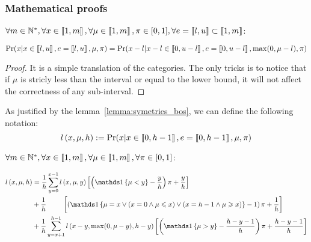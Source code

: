 \subsubsection{Mathematical proofs}

\begin{lemma}
    \label{lemma:symetries_bos}
    $\forall m \in \mathbb{N}^*, \forall x \in \left\llbracket1, m\right\rrbracket, \forall \mu \in \left\llbracket1, m\right\rrbracket, \pi \in [0, 1], \forall e = \left\llbracket l, u\right\rrbracket \subset \left\llbracket1, m\right\rrbracket$:
    
    \[ \Pr(x | x \in \left\llbracket l, u\right\rrbracket, e = \left\llbracket l, u\right\rrbracket, \mu, \pi) = \Pr(x - l | x - l \in \left\llbracket0, u - l\right\rrbracket, e= \left\llbracket0, u - l\right\rrbracket, \max(0, \mu - l), \pi)\]
\end{lemma}
\begin{proof}
    It is a simple translation of the categories. The only tricks is to notice that if $\mu$ is stricly less than the interval or equal to the lower bound, it will not affect the correctness of any sub-interval.
\end{proof}

\begin{definition}
    As justified by the lemma~\ref{lemma:symetries_bos}, we can define the following notation:
    \[ \mathnormal{l}\left(x, \mu, h\right) := \Pr(x | x \in \left\llbracket0, h - 1\right\rrbracket, e = \left\llbracket0, h - 1\right\rrbracket, \mu, \pi) \]
\end{definition}

\begin{thm}
    \label{thm:computing_likelihood_bos}
    $\forall m \in \mathbb{N}^*, \forall x \in \left\llbracket1, m\right\rrbracket, \forall \mu \in \left\llbracket1, m\right\rrbracket, \forall \pi \in [0, 1]$:

\begin{equation}
    \begin{aligned}
        \bosl{x}{\mu}{h}
        &=\frac{1}{h} \sum_{y = 0}^{x - 1} \bosl{x}{\mu}{y} \left[ \left( \indickronecker{\mu < y} - \frac{y}{h} \right) \pi + \frac{y}{h} \right] \\
        &+\frac{1}{h} \ \qquad \left[ \left( \indickronecker{\mu = x \lor (x = 0 \land \mu \leq x) \lor (x = h - 1 \land \mu \geq x)} - 1 \right) \pi +  \frac{1}{h} \right] \\
        &+\frac{1}{h} \sum_{y = x + 1}^{h - 1}\bosl{x - y}{\max(0, \mu - y)}{h - y}    \left[ \left( \indickronecker{\mu > y} - \frac{h - y - 1}{h} \right) \pi + \frac{h - y - 1}{h} \right]
    \end{aligned} \\
\end{equation}
\end{thm}

